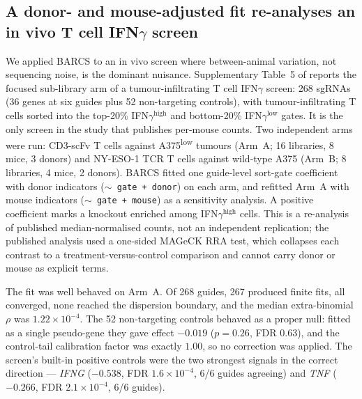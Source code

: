 \subsection{A donor- and mouse-adjusted fit re-analyses an in vivo T cell IFN$\gamma$
screen}
\label{sec:liu}

We applied BARCS to an in vivo screen where between-animal variation, not
sequencing noise, is the dominant nuisance.  Supplementary Table~5 of
\citet{liu2026invivo} reports the focused sub-library arm of a
tumour-infiltrating T cell IFN$\gamma$ screen: 268 sgRNAs (36 genes at six
guides plus 52 non-targeting controls), with tumour-infiltrating T cells sorted
into the top-20\% IFN$\gamma^\text{high}$ and bottom-20\% IFN$\gamma^\text{low}$
gates.  It is the only screen in the study that publishes per-mouse counts.  Two
independent arms were run: CD3-scFv T cells against A375\textsuperscript{low}
tumours (Arm~A; 16 libraries, 8 mice, 3 donors) and NY-ESO-1 TCR T cells against
wild-type A375 (Arm~B; 8 libraries, 4 mice, 2 donors).  BARCS fitted one
guide-level sort-gate coefficient with donor indicators (\texttt{$\sim$ gate +
donor}) on each arm, and refitted Arm~A with mouse indicators
(\texttt{$\sim$ gate + mouse}) as a sensitivity analysis.  A positive coefficient
marks a knockout enriched among IFN$\gamma^\text{high}$ cells.  This is a
re-analysis of published median-normalised counts, not an independent
replication; the published analysis used a one-sided MAGeCK RRA test, which
collapses each contrast to a treatment-versus-control comparison and cannot carry
donor or mouse as explicit terms.

The fit was well behaved on Arm~A.  Of 268 guides, 267 produced finite fits, all
converged, none reached the dispersion boundary, and the median extra-binomial
$\rho$ was $1.22\times10^{-4}$.  The 52 non-targeting controls behaved as a
proper null: fitted as a single pseudo-gene they gave effect $-0.019$
($p=0.26$, FDR $0.63$), and the control-tail calibration factor was exactly
$1.00$, so no correction was applied.  The screen's built-in positive controls
were the two strongest signals in the correct direction --- \textit{IFNG}
($-0.538$, FDR $1.6\times10^{-4}$, 6/6 guides agreeing) and \textit{TNF}
($-0.266$, FDR $2.1\times10^{-4}$, 6/6 guides).

